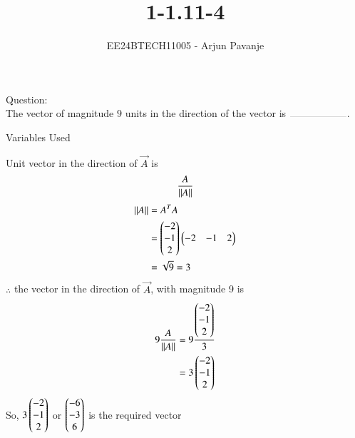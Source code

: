\documentclass[journal]{IEEEtran}
\begin{document}

\vspace{3cm}

\title{1-1.11-4}
\author{EE24BTECH11005 - Arjun Pavanje
}
{\let\newpage\relax\maketitle}
Question:\\
The vector of magnitude $9$ units in the direction of the vector  is $\rule{2cm}{0.1pt}$.
\begin{table}[h!]    
  \centering
  
  \caption{Variables Used}
  \label{tab1-1.9-6}
\end{table}
\solution
Unit vector in the direction of $\vec{A}$ is
\begin{align}
	\frac{A}{\left\lVert A\right\rVert}
\end{align}
\begin{align}
	\left\lVert A\right\rVert &= A^TA\\
	&= \begin{pmatrix}-2\\-1\\2\end{pmatrix}\begin{pmatrix}-2 & -1 & 2\end{pmatrix}\\
	&= \sqrt{9} = 3
\end{align}
$\therefore$ the vector in the direction of $\vec{A}$, with magnitude 9 is
\begin{align}
	9 \frac{A}{\left\lVert A\right\rVert} &= 9 \frac{\begin{pmatrix}-2\\-1\\2\end{pmatrix}}{3}\\
	&= 3\begin{pmatrix}-2\\-1\\2\end{pmatrix}
\end{align}
So, $3\begin{pmatrix}-2\\-1\\2\end{pmatrix}$ or $\begin{pmatrix}-6\\-3\\6\end{pmatrix}$ is the required vector\\
\end{document}
